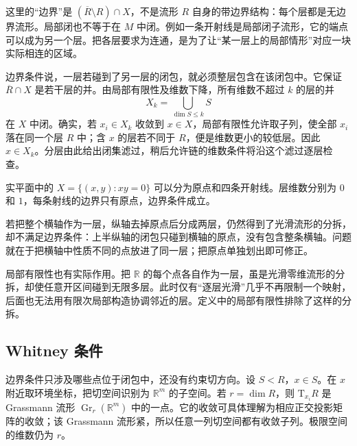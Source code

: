 这里的“边界”是 \((\overline R\setminus R)\cap X\)，不是流形 \(R\) 自身的带边界结构：每个层都是无边界流形。局部闭也不等于在 \(M\) 中闭。例如一条开射线是局部闭子流形，它的端点可以成为另一个层。把各层要求为连通，是为了让“某一层上的局部情形”对应一块实际相连的区域。

\ProseParagraphBreak

边界条件说，一层若碰到了另一层的闭包，就必须整层包含在该闭包中。它保证 \(\overline R\cap X\) 是若干层的并。由局部有限性及维数下降，所有维数不超过 \(k\) 的层的并
\[
	X_k=\bigcup_{\dim S\leq k}S
\]
在 \(X\) 中闭。确实，若 \(x_i\in X_k\) 收敛到 \(x\in X\)，局部有限性允许取子列，使全部 \(x_i\) 落在同一个层 \(R\) 中；含 \(x\) 的层若不同于 \(R\)，便是维数更小的较低层。因此 \(x\in X_k\)。分层由此给出闭集滤过，稍后允许链的维数条件将沿这个滤过逐层检查。

\begin{example}\label{g2:exm:cross-stratification}
	实平面中的 \(X=\{(x,y):xy=0\}\) 可以分为原点和四条开射线。层维数分别为 \(0\) 和 \(1\)，每条射线的边界只有原点，边界条件成立。

	若把整个横轴作为一层，纵轴去掉原点后分成两层，仍然得到了光滑流形的分拆，却不满足边界条件：上半纵轴的闭包只碰到横轴的原点，没有包含整条横轴。问题就在于把横轴中性质不同的点放进了同一层；把原点单独划出即可修正。
\end{example}

局部有限性也有实际作用。把 \(\mathbb R\) 的每个点各自作为一层，虽是光滑零维流形的分拆，却使任意开区间碰到无限多层。此时仅有“逐层光滑”几乎不再限制一个映射，后面也无法用有限次局部构造协调邻近的层。定义中的局部有限性排除了这样的分拆。

\subsection{Whitney 条件}
\label{g2:subsec:B01:02}

边界条件只涉及哪些点位于闭包中，还没有约束切方向。设 \(S<R\)，\(x\in S\)。在 \(x\) 附近取环境坐标，把切空间识别为 \(\mathbb R^m\) 的子空间。若 \(r=\dim R\)，则 \(\mathrm T_{x_i}R\) 是 Grassmann 流形 \(\operatorname{Gr}_r(\mathbb R^m)\) 中的一点。它的收敛可具体理解为相应正交投影矩阵的收敛；该 Grassmann 流形紧，所以任意一列切空间都有收敛子列。极限空间的维数仍为 \(r\)。

